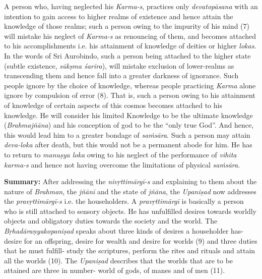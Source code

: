 A person who, having neglected his \emph{Karma-s}, practices only \emph{devatopāsana} with an intention to gain access to higher realms of existence and hence attain the knowledge of those realms; such a person owing to the impurity of his mind (7) will mistake his neglect of \emph{Karma-s} as renouncing of them, and becomes attached to his accomplishments i.e. his attainment of knowledge of deities or higher \emph{lokas}. In the words of Sri Aurobindo, such a person being attached to the higher state (subtle existence, \emph{sūkṣma śarīra}), will mistake exclusion of lower-realms as transcending them and hence fall into a greater darkness of ignorance. Such people ignore by the choice of knowledge, whereas people practicing \emph{Karma} alone ignore by compulsion of error (8). That is, such a person owing to his attainment of knowledge of certain aspects of this cosmos becomes attached to his knowledge. He will consider his limited Knowledge to be the ultimate knowledge (\emph{Brahmajñāna}) and his conception of god to be the ``only true God''. And hence, this would lead him to a greater bondage of \emph{saṁsāra}. Such a person may attain \emph{deva-loka} after death, but this would not be a permanent abode for him. He has to return to \emph{manuṣya loka} owing to his neglect of the performance of \emph{vihita karma-s} and hence not having overcome the limitations of physical \emph{saṁsāra}.

\textbf{Summary:} After addressing the \emph{nivṛttimārgī-s} and explaining to them about the nature of \emph{Brahman}, the \emph{jñānī} and the state of \emph{jñāna}, the \emph{Upaniṣad} now addresses the \emph{pravṛttimārgī-s} i.e. the householders. A \emph{pravṛttimārgī} is basically a person who is still attached to sensory objects. He has unfulfilled desires towards worldly objects and obligatory duties towards the society and the world. The \emph{Bṛhadāraṇyakopaniṣad} speaks about three kinds of desires a householder has- desire for an offspring, desire for wealth and desire for worlds (9) and three duties that he must fulfill- study the scriptures, perform the rites and rituals and attain all the worlds (10). The \emph{Upaniṣad} describes that the worlds that are to be attained are three in number- world of gods, of manes and of men (11).


